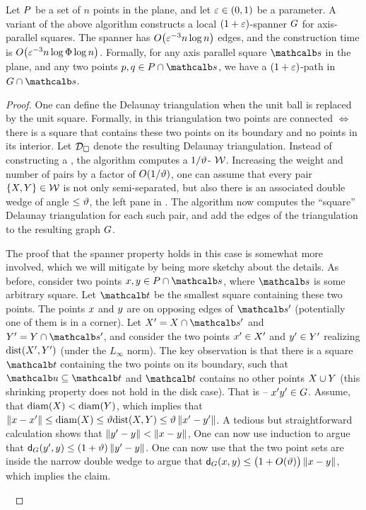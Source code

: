 \documentclass[12pt]{article}%
\begin{document}
\begin{lemma}
    Let $P$ be a set of $n$ points in the plane, and let
    $\varepsilon \in (0,1)$ be a parameter. A variant of the above algorithm
    constructs a local $(1+\varepsilon)$-spanner $G$ for axis-parallel
    squares. The spanner has $O\pth{ \eps^{-3} n \log n }$ edges, and
    the construction time is
    $O\pth{ \eps^{-3} n\log \spread \log n }$.  Formally, for any axis
    parallel square $\sqr$ in the plane, and any two points
    $\pa, \pb \in \PS \cap \sqr$, we have a $(1+\varepsilon)$-path in
    $\restrictY{\G}{\sqr}$.
\end{lemma}
\begin{proof}
    One can define the Delaunay triangulation when the unit ball is
    replaced by the unit square. Formally, in this triangulation two
    points are connected $\iff$ there is a square that contains these
    two points on its boundary and no points in its interior. Let
    $\mathcal{D}_\square$ denote the resulting Delaunay triangulation. Instead
    of constructing a \WSPD, the algorithm computes a $1/\vartheta$-\SSPD
    $\mathcal{W}$. Increasing the weight and number of pairs by a factor of
    $O(1/\vartheta)$, one can assume that every pair
    $\{ X, Y \} \in \mathcal{W}$ is not only semi-separated, but also
    there is an associated double wedge of angle $\leq \vartheta$, the
    left pane in . The algorithm now computes the
    ``square'' Delaunay triangulation for each such pair, and add the
    edges of the triangulation to the resulting graph $G$.

    The proof that the spanner property holds in this case is somewhat
    more involved, which we will mitigate by being more sketchy about
    the details. As before, consider two points
    $\px, \py \in \PS \cap \sqr$, where $\sqr$ is some arbitrary
    square. Let $\sqrA$ be the smallest square containing these two
    points. The points $x$ and $y$ are on opposing edges of
    $\sqr'$ (potentially one of them is in a corner). Let
    $\PSX' = \PSX \cap \sqr'$ and $\PSY' = \PSY \cap \sqr'$, and
    consider the two points $x' \in X'$ and $y' \in Y'$
    realizing $\DistSetY{\PSX'}{\PSY'}$ (under the $L_\infty$
    norm). The key observation is that there is a square $\sqrA$
    containing the two points on its boundary, such that
    $\sqrB \subseteq \sqrA$ and $\sqrA$ contains no other points
    $X \cup Y$ (this shrinking property does not hold in the
    disk case). That is -- $x' y' \in G$. Assume, that
    $\diameterX{\PSX} < \diameterX{\PSY}$, which implies that
    $\dY{\px}{\px'} \leq \diameterX{\PSX} \leq \epsA
    \DistSetY{\PSX}{\PSY} \leq \epsA \dY{\px'}{\py'}$. A tedious but
    straightforward calculation shows that
    $\left\| y' - y \right\| < \left\| x - y \right\|$, One can now use induction to
    argue that $\dGZ{\G}{\py'}{\py} \leq (1+\epsA)
    \dY{\py'}{\py}$. One can now use that the two point sets are
    inside the narrow double wedge to argue that
    $\dGZ{\G}{\px}{\py} \leq \bigl(1+O(\epsA)\bigr)\dY{\px}{\py}$,
    which implies the claim.


    ~
\end{proof}
\end{document}
